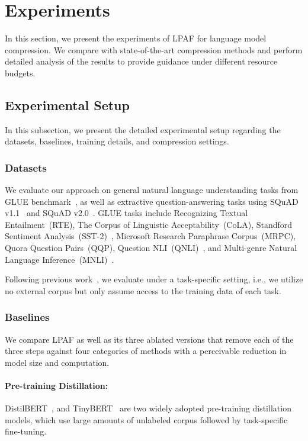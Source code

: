 \section{Experiments}
In this section, we present the experiments of LPAF for language model compression. We compare with state-of-the-art compression methods and perform detailed analysis of the results to provide guidance under different resource budgets.

\subsection{Experimental Setup}
In this subsection, we present the detailed experimental setup regarding the datasets, baselines, training details, and compression settings.
\subsubsection{Datasets} 
We evaluate our approach on general natural language understanding tasks from GLUE benchmark~\cite{glue}, as well as extractive question-answering tasks using SQuAD v1.1~\cite{qnliandsquad} and SQuAD v2.0~\cite{squadv2.0}. GLUE tasks include Recognizing Textual Entailment~(RTE), The Corpus of Linguistic Acceptability~(CoLA), Standford Sentiment Analysis~(SST-2)~\cite{sst2}, Microsoft Research Paraphrase Corpus~(MRPC), Quora Question Pairs~(QQP), Question NLI~(QNLI)~\cite{mrpc}, and Multi-genre Natural Language Inference~(MNLI)~\cite{mnli}.

Following previous work~\cite{pkd}, we evaluate under a task-specific setting, i.e., we utilize no external corpus but only assume access to the training data of each task.



\subsubsection{Baselines} We compare LPAF as well as its three ablated versions that remove each of the three steps  against four categories of methods with a perceivable reduction in model size and computation.

\paragraph{Pre-training Distillation: }DistilBERT~\cite{distilbert}, and TinyBERT~\cite{tinybert} are two widely adopted pre-training distillation models, which use large amounts of unlabeled corpus followed by task-specific fine-tuning.

